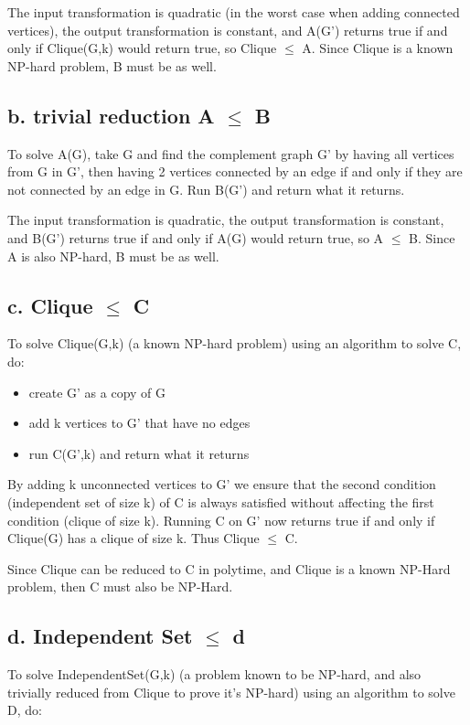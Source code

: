 \documentclass[a4paper]{article}
\begin{document}
The input transformation is quadratic (in the worst case when adding connected vertices), the output transformation is constant, and A(G') returns true if and only if Clique(G,k) would return true, so Clique $\leq$ A. Since Clique is a known NP-hard problem, B must be as well.

\subsection{b. trivial reduction A $\leq$ B}
To solve A(G), take G and find the complement graph G' by having all vertices from G in G', then having 2 vertices connected by an edge if and only if they are not connected by an edge in G. Run B(G') and return what it returns.

The input transformation is quadratic, the output transformation is constant, and B(G') returns true if and only if A(G) would return true, so A $\leq$ B. Since A is also NP-hard, B must be as well.

\subsection{c. Clique $\leq$ C}
To solve Clique(G,k) (a known NP-hard problem) using an algorithm to solve C, do:

\begin{itemize}
    \item create G' as a copy of G
    \item add k vertices to G' that have no edges
    \item run C(G',k) and return what it returns
\end{itemize}

By adding k unconnected vertices to G' we ensure that the second condition (independent set of size k) of C is always satisfied without affecting the first condition (clique of size k). Running C on G' now returns true if and only if Clique(G) has a clique of size k. Thus Clique $\leq$ C.

Since Clique can be reduced to C in polytime, and Clique is a known NP-Hard problem, then C must also be NP-Hard.

\subsection{d. Independent Set $\leq$ d}
To solve IndependentSet(G,k) (a problem known to be NP-hard, and also trivially reduced from Clique to prove it's NP-hard) using an algorithm to solve D, do:
\end{document}
